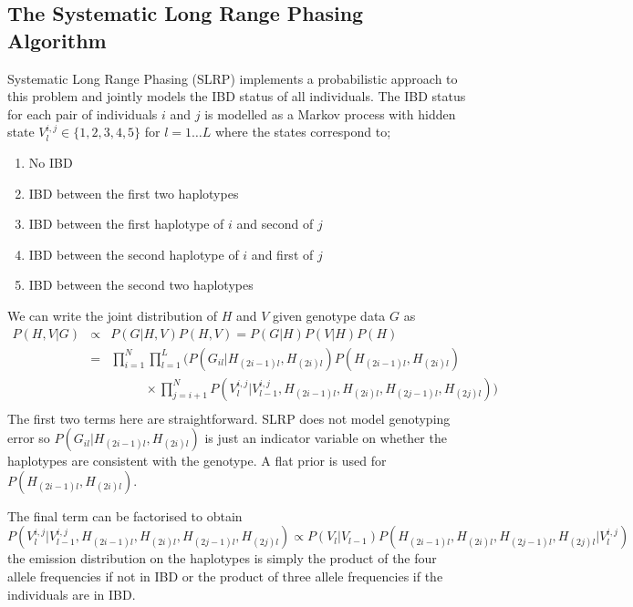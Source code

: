 \subsection{The Systematic Long Range Phasing Algorithm}
Systematic Long Range Phasing (SLRP)\citep{palin2011identity} implements a probabilistic approach to this problem and jointly models the IBD status of all individuals.  The IBD status for each pair of individuals $i$ and $j$ is modelled as a Markov process with hidden state $V^{i,j}_l \in \{1,2,3,4,5\}$ for $l=1\ldots L$ where the states correspond to; 
\begin{enumerate}
\item No IBD
\item IBD between the first two haplotypes
\item IBD between the first haplotype of $i$ and second of $j$
\item IBD between the second haplotype of $i$ and first of $j$ 
\item IBD between the second two haplotypes
\end{enumerate}
We can write the joint distribution of $H$ and $V$ given genotype data $G$ as
\begin{eqnarray*}
  P(H,V|G) &  \propto & P(G|H,V)P(H,V) = P(G|H)P(V|H)P(H) \\
  & = & \prod_{i=1}^N \prod_{l=1}^L \Bigg( P(G_{il}|H_{(2i-1)l},H_{(2i)l}) P(H_{(2i-1)l},H_{(2i)l})\\
&&~~~~~~~~~~~~\times \prod_{j=i+1}^N P(V_l^{i,j}|V_{l-1}^{i,j},H_{(2i-1)l},H_{(2i)l},H_{(2j-1)l},H_{(2j)l})\Bigg)\\
\end{eqnarray*}
The first two terms here are straightforward. SLRP does not model genotyping error so $P(G_{il}|H_{(2i-1)l},H_{(2i)l})$ is just an indicator variable on whether the haplotypes are consistent with the genotype. A flat prior is used for $P(H_{(2i-1)l},H_{(2i)l})$.  

The final term can be factorised to obtain
$$P(V_l^{i,j}|V_{l-1}^{i,j},H_{(2i-1)l},H_{(2i)l},H_{(2j-1)l},H_{(2j)l})\propto P(V_l|V_{l-1}) P(H_{(2i-1)l},H_{(2i)l},H_{(2j-1)l},H_{(2j)l}|V^{i,j}_l)$$
the emission distribution on the haplotypes is simply the product of the four allele frequencies if not in IBD or the product of
 three allele frequencies if the individuals are in IBD. 

